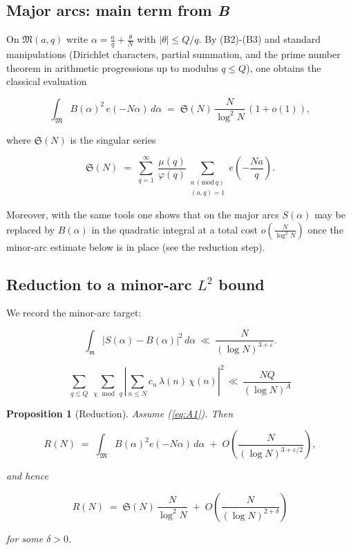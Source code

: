 \documentclass[11pt]{article}
\def\eqref#1{(\ref{#1})}%
\newtheorem{proposition}[lemma]{Proposition}
\theoremstyle{definition}
\theoremstyle{remark}
\numberwithin{equation}{part}
\begin{document}
\subsection{Major arcs: main term from \textit{B}}

On $\mathfrak M(a,q)$ write $\alpha=\tfrac{a}{q}+\tfrac{\theta}{N}$ with
$|\theta|\le Q/q$. By (B2)-(B3) and standard manipulations (Dirichlet characters, partial summation, and the prime number theorem in arithmetic progressions up to modulus $q\le Q$), one obtains the classical evaluation

$$
	\int_{\mathfrak M} B(\alpha)^2\,e(-N\alpha)\,d\alpha
	\;=\;\mathfrak S(N)\,\frac{N}{\log^2 N}\,(1+o(1)),
$$

where $\mathfrak S(N)$ is the singular series

$$
	\mathfrak S(N)\;=\;\sum_{q=1}^{\infty}\ \frac{\mu(q)}{\varphi(q)}\!
	\sum_{\substack{a\,(\mathrm{mod}\,q)\\(a,q)=1}} e\!\left(-\frac{Na}{q}\right).
$$

Moreover, with the same tools one shows that on the major arcs $S(\alpha)$ may be replaced by $B(\alpha)$ in the quadratic integral at a total cost $o\!\left(\tfrac{N}{\log^2 N}\right)$ once the minor-arc estimate below is in place (see the reduction step).


\subsection{Reduction to a minor-arc \texorpdfstring{$L^2$}{L-2} bound}

We record the minor-arc target:

\begin{equation}\label{eq:A1}
	\int_{\mathfrak m}|S(\alpha)-B(\alpha)|^2\,d\alpha\ \ll\ \frac{N}{(\log N)^{3+\varepsilon}}.
\end{equation}

\begin{equation}\label{eq:char-second-moment}\sum_{q\le Q}\ \sum_{\chi\,\bmod\, q}\left|\sum_{n\le N} c_n\,\lambda(n)\,\chi(n)\right|^{2}\,\ll\, \frac{NQ}{(\log N)^A}\end{equation}
\begin{proposition}[Reduction]\label{prop:reduction}
	Assume \eqref{eq:A1}. Then

	$$
		R(N)\;=\;\int_{\mathfrak M} B(\alpha)^2 e(-N\alpha)\,d\alpha\;+\;O\!\left(\frac{N}{(\log N)^{3+\varepsilon/2}}\right),
	$$

	and hence

	$$
		R(N)\;=\;\mathfrak S(N)\,\frac{N}{\log^{2}N}\;+\;O\!\left(\frac{N}{(\log N)^{2+\delta}}\right)
	$$

	for some $\delta>0$.

\end{proposition}
\end{document}
